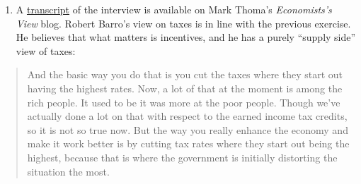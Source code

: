\documentclass[]{book}
\providecommand{\tightlist}{%
  \setlength{\itemsep}{0pt}\setlength{\parskip}{0pt}}
\begin{document}
\begin{enumerate}
\def\labelenumi{\arabic{enumi}.}
\tightlist
\item
  A
  \href{https://economistsview.typepad.com/economistsview/2007/03/krugman_vs_barr.html}{transcript}
  of the interview is available on Mark Thoma's \emph{Economists's View}
  blog. Robert Barro's view on taxes is in line with the previous
  exercise. He believes that what matters is incentives, and he has a
  purely ``supply side'' view of taxes:
\end{enumerate}

\begin{quote}
And the basic way you do that is you cut the taxes where they start out
having the highest rates. Now, a lot of that at the moment is among the
rich people. It used to be it was more at the poor people. Though we've
actually done a lot on that with respect to the earned income tax
credits, so it is not so true now. But the way you really enhance the
economy and make it work better is by cutting tax rates where they start
out being the highest, because that is where the government is initially
distorting the situation the most.
\end{quote}
\end{document}
